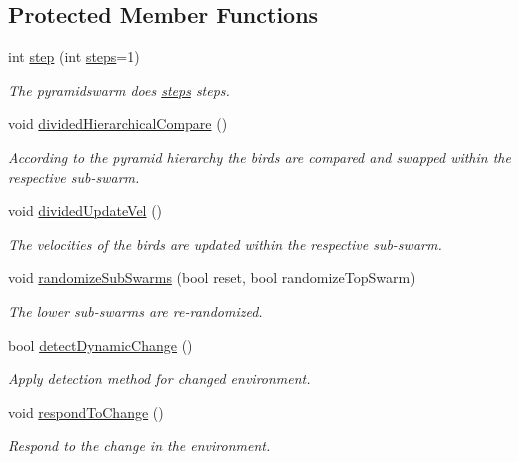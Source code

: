 \subsection*{Protected Member Functions}
\begin{CompactItemize}
\item 
int \hyperlink{classDynamicPyramidSwarm_ffcde6a425fd052c0bd5a65124a204a1}{step} (int \hyperlink{runpso_8cpp_b4ae7205573977222eadd0795db193e2}{steps}=1)
\begin{CompactList}\small\item\em The pyramidswarm does \hyperlink{runpso_8cpp_b4ae7205573977222eadd0795db193e2}{steps} steps. \item\end{CompactList}\item 
void \hyperlink{classDynamicPyramidSwarm_22575508717d5555be45f05efaa8ee3e}{dividedHierarchicalCompare} ()
\begin{CompactList}\small\item\em According to the pyramid hierarchy the birds are compared and swapped within the respective sub-swarm. \item\end{CompactList}\item 
void \hyperlink{classDynamicPyramidSwarm_64639e24390ed1c07f615c979f1595bf}{dividedUpdateVel} ()
\begin{CompactList}\small\item\em The velocities of the birds are updated within the respective sub-swarm. \item\end{CompactList}\item 
void \hyperlink{classDynamicPyramidSwarm_82676482de529f96eecaeaead9fc29c2}{randomizeSubSwarms} (bool reset, bool randomizeTopSwarm)
\begin{CompactList}\small\item\em The lower sub-swarms are re-randomized. \item\end{CompactList}\item 
bool \hyperlink{classDynamicPyramidSwarm_ae6437872484ff8baa443d3c2beee820}{detectDynamicChange} ()
\begin{CompactList}\small\item\em Apply detection method for changed environment. \item\end{CompactList}\item 
void \hyperlink{classDynamicPyramidSwarm_fbbb06914f9500603fee564415d976ae}{respondToChange} ()
\begin{CompactList}\small\item\em Respond to the change in the environment. \item\end{CompactList}\end{CompactItemize}
